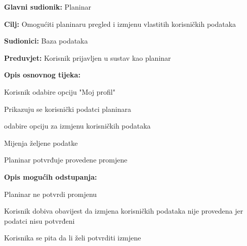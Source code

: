 			\noindent {}
		\begin{packed_item}
			
			\item \textbf{Glavni sudionik: }$ $Planinar$ $
			\item  \textbf{Cilj:} $ $Omogućiti planinaru pregled i izmjenu vlastitih korisničkih podataka $ $
			\item  \textbf{Sudionici:} $ $Baza podataka$ $
			\item  \textbf{Preduvjet:} $ $Korisnik prijavljen u sustav kao planinar$ $
			\item  \textbf{Opis osnovnog tijeka:}
			
			\item[] \begin{packed_enum}
				
				\item $ $Korisnik odabire opciju "Moj profil"$ $
				\item $ $Prikazuju se korisnički podatci planinara$ $
				\item $ $odabire opciju za izmjenu korisničkih podataka $ $
				\item $ $Mijenja željene podatke$ $
				\item $ $Planinar potvrđuje provedene promjene$ $
				
			\end{packed_enum}
		
		\item  \textbf{Opis mogućih odstupanja:}
		
		\item[] \begin{packed_item}
			
			\item[5.a] $ $Planinar ne potvrdi promjenu $ $
			\item[] \begin{packed_enum}
				
				\item $ $Korisnik dobiva obavijest da izmjena korisničkih podataka nije provedena jer podatci nisu potvrđeni$ $
				\item $ $Korisnika se pita da li želi potvrditi izmjene$ $
			\end{packed_enum}
		\end{packed_item}
		\end{packed_item}
		
